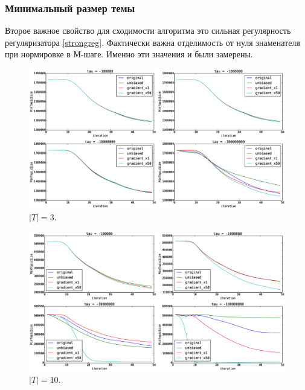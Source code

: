 \documentclass[12pt]{article}
\begin{document}
\subsubsection{Минимальный размер темы}
Второе важное свойство для сходимости алгоритма это сильная регулярность регуляризатора \ref{strongreg}. Фактически важна отделимость от нуля знаменателя при нормировке в М-шаге. Именно эти значения  и были замерены.
\begin{figure}[H]
	\centering
	\caption{$|T| = 3$.}    
	\includegraphics[width=1.0\linewidth]{pictures/topics_3_MinTopicSize}
\end{figure}

\begin{figure}[H]
	\centering
	\caption{$|T| = 10$.}    
	\includegraphics[width=1.0\linewidth]{pictures/topics_10_MinTopicSize}
\end{figure}
\end{document}
